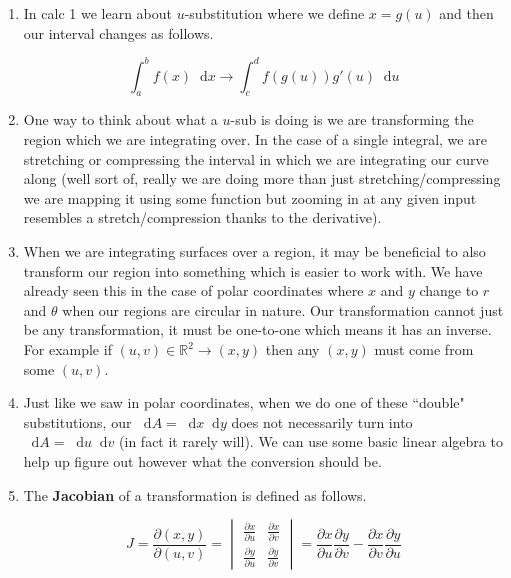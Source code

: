 \documentclass[11pt]{article}
\newcommand*\dif{\mathop{}\!\mathrm{d}}
\begin{document}
\begin{enumerate}

\item In calc 1 we learn about $u$-substitution where we define $x = g(u)$ and then our interval changes as follows.

\begin{equation*}
    \int_a^b f(x) \dif{x} \to \int_c^d f(g(u)) g'(u) \dif{u}
\end{equation*}

\item One way to think about what a $u$-sub is doing is we are transforming the region which we are integrating over. In the case of a single integral, we are stretching or compressing the interval in which we are integrating our curve along (well sort of, really we are doing more than just stretching/compressing we are mapping it using some function but zooming in at any given input resembles a stretch/compression thanks to the derivative).

\item When we are integrating surfaces over a region, it may be beneficial to also transform our region into something which is easier to work with. We have already seen this in the case of polar coordinates where $x$ and $y$ change to $r$ and $\theta$ when our regions are circular in nature. Our transformation cannot just be any transformation, it must be one-to-one which means it has an inverse. For example if $(u,v)\in \mathbb{R}^2 \to (x,y)$ then any $(x,y)$ must come from some $(u,v)$.

\item Just like we saw in polar coordinates, when we do one of these ``double" substitutions, our $\dif{A} = \dif{x}\dif{y}$ does not necessarily turn into $\dif{A} = \dif{u}\dif{v}$ (in fact it rarely will). We can use some basic linear algebra to help up figure out however what the conversion should be.


\item The \textbf{Jacobian} of a transformation is defined as follows.

\begin{equation*}
J = \frac{\partial (x,y)}{\partial (u,v)} = \begin{vmatrix}
    \frac{\partial x}{\partial u} & \frac{\partial x}{\partial v} \\[6pt]
    \frac{\partial y}{\partial u}  & \frac{\partial y}{\partial v} 
\end{vmatrix} = \frac{\partial x}{\partial u} \frac{\partial y}{\partial v} - \frac{\partial x}{\partial v} \frac{\partial y}{\partial u}
\end{equation*}


\end{enumerate}
\end{document}
